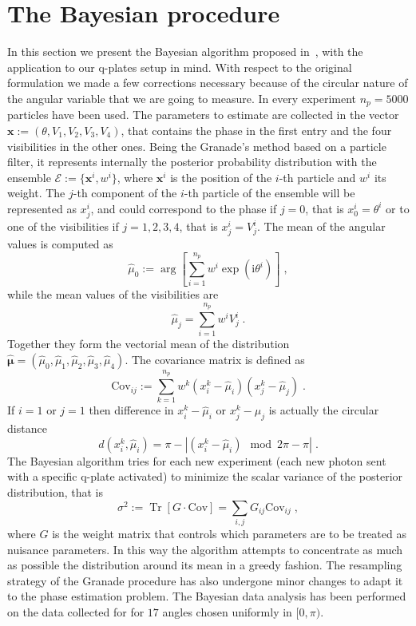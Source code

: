 \documentclass[aps, pra, 10pt, twocolumn, superscriptaddress,floatfix]{revtex4-1}
\DeclareMathOperator{\tr}{Tr}
\newcommand{\mi}{\mathrm{i}} %
\begin{document}
\section{The Bayesian procedure}
\label{sec:bayesian}
%
In this section we present the Bayesian algorithm proposed in~\cite{Granade2012}, with the application to our q-plates setup in mind. With respect to the original formulation we made a few corrections necessary because of the circular nature of the angular variable that we are going to measure. In every experiment $n_p = 5000$ particles have been used. The parameters to estimate are collected in the vector $\boldsymbol{x} := \left( \theta, V_1, V_2, V_3, V_4 \right)$, that contains the phase in the first entry and the four visibilities in the other ones. Being the Granade's method based on a particle filter, it represents internally the posterior probability distribution with the ensemble $\mathcal{E} := \lbrace \boldsymbol{x}^i, w^i \rbrace$, where $\boldsymbol{x}^i$ is the position of the $i$-th particle and $w^i$ its weight. The $j$-th component of the $i$-th particle of the ensemble will be represented as $x_j^i$, and could correspond to the phase if $j=0$, that is $x^i_0 = \theta^i$ or to one of the visibilities if $j=1, 2, 3, 4$, that is $x^i_j = V^i_j$. The mean of the angular values is computed as
%
\begin{equation}
	\hat{\mu}_0 := \arg \left[ \sum_{i=1}^{n_{p}} w^i \exp \left( \mi \theta^i \right) \right] \; ,
\end{equation}
%
while the mean values of the visibilities are
%
\begin{equation}
	\hat{\mu}_j = \sum_{i=1}^{n_p} w^i V^i_j \; .
\end{equation}
%
Together they form the vectorial mean of the distribution $\boldsymbol{\hat{\mu}} = (\hat{\mu}_0, \hat{\mu}_1, \hat{\mu}_2, \hat{\mu}_3, \hat{\mu}_4)$. The covariance matrix is defined as
%
\begin{equation}
	\text{Cov}_{ij} := \sum_{k=1}^{n_{p}} w^k (x^k_i - \hat{\mu}_i)  (x^k_j - \hat{\mu}_j) \; .
\end{equation}
%
If $i=1$ or $j=1$ then difference in $x^k_i - \hat{\mu}_i$ or $x^k_j - \hat{\mu}_j$ is actually the circular distance
%
\begin{equation}
	d(x^k_i, \hat{\mu}_i) = \pi - | (x^k_i - \hat{\mu}_i) \mod 2 \pi - \pi| \; .
\end{equation}
%
The Bayesian algorithm tries for each new experiment (each new photon sent with a specific q-plate activated) to minimize the scalar variance of the posterior distribution, that is
%
\begin{equation}
	\sigma^2 := \tr \left[ G \cdot \text{Cov} \right] = \sum_{i, j} G_{ij} \text{Cov}_{ij} \; ,
\end{equation}
%
where $G$ is the weight matrix that controls which parameters are to be treated as nuisance parameters. In this way the algorithm attempts to concentrate as much as possible the distribution around its mean in a greedy fashion. The resampling strategy of the Granade procedure has also undergone minor changes to adapt it to the phase estimation problem. The Bayesian data analysis has been performed on the data collected for for $17$ angles chosen uniformly in $[0, \pi)$.
%
\end{document}
